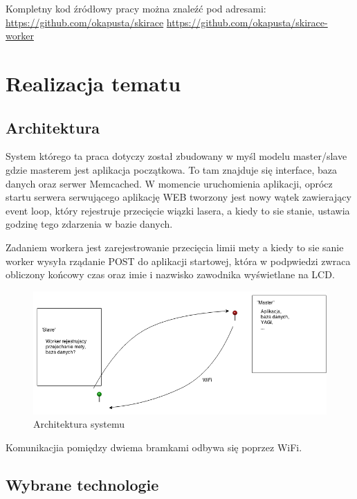 \documentclass[11pt,a4paper, twoside]{article}
\begin{document}
\noindent
Kompletny kod źródłowy pracy można znaleźć pod adresami:
\newline
\url{https://github.com/okapusta/skirace}
\newline
\url{https://github.com/okapusta/skirace-worker}

\newpage

\newpage
\noindent
\section{Realizacja tematu}
\subsection{Architektura}
System którego ta praca dotyczy został zbudowany w myśl modelu master/slave gdzie masterem jest aplikacja początkowa. To tam znajduje się interface, baza danych oraz serwer Memcached. W momencie uruchomienia aplikacji, oprócz startu serwera serwującego aplikację WEB tworzony jest nowy wątek zawierający event loop, który rejestruje przecięcie wiązki lasera, a kiedy to sie stanie, ustawia godzinę tego zdarzenia w bazie danych.

Zadaniem workera jest zarejestrowanie przecięcia limii mety a kiedy to sie sanie worker wysyła rządanie POST do aplikacji startowej, która w podpwiedzi zwraca obliczony końcowy czas oraz imie i nazwisko zawodnika wyświetlane na LCD.
\newline

\begin{figure}[ht]
\includegraphics[scale=0.5]{./img/asdasd.png}
\caption{Architektura systemu}
\end{figure}
\noindent
Komunikacjia pomiędzy dwiema bramkami odbywa się poprzez WiFi.
\subsection{Wybrane technologie}
\end{document}

